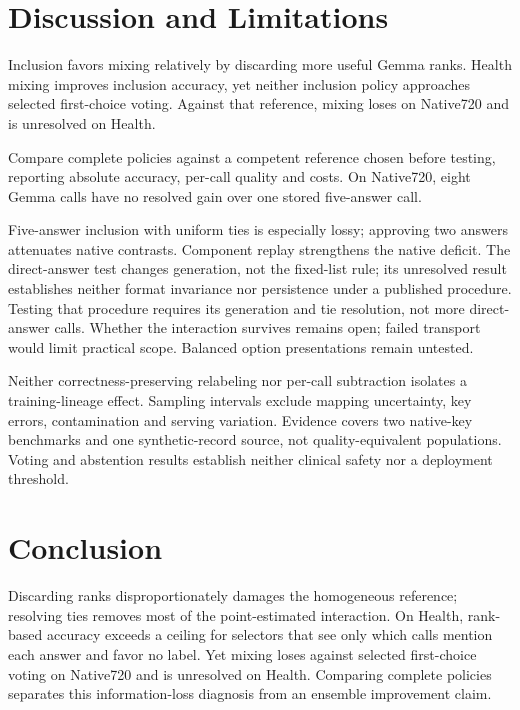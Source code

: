 \documentclass{article}
\begin{document}
\section{Discussion and Limitations}

Inclusion favors mixing relatively by discarding more useful Gemma ranks. Health mixing improves inclusion accuracy, yet neither inclusion policy approaches selected first-choice voting. Against that reference, mixing loses on Native720 and is unresolved on Health.

Compare complete policies against a competent reference chosen before testing, reporting absolute accuracy, per-call quality and costs. On Native720, eight Gemma calls have no resolved gain over one stored five-answer call.

Five-answer inclusion with uniform ties is especially lossy; approving two answers attenuates native contrasts. Component replay strengthens the native deficit. The direct-answer test changes generation, not the fixed-list rule; its unresolved result establishes neither format invariance nor persistence under a published procedure. Testing that procedure requires its generation and tie resolution, not more direct-answer calls. Whether the interaction survives remains open; failed transport would limit practical scope. Balanced option presentations remain untested.

Neither correctness-preserving relabeling nor per-call subtraction isolates a training-lineage effect. Sampling intervals exclude mapping uncertainty, key errors, contamination and serving variation. Evidence covers two native-key benchmarks and one synthetic-record source, not quality-equivalent populations. Voting and abstention results establish neither clinical safety nor a deployment threshold.

\section{Conclusion}

Discarding ranks disproportionately damages the homogeneous reference; resolving ties removes most of the point-estimated interaction. On Health, rank-based accuracy exceeds a ceiling for selectors that see only which calls mention each answer and favor no label. Yet mixing loses against selected first-choice voting on Native720 and is unresolved on Health. Comparing complete policies separates this information-loss diagnosis from an ensemble improvement claim.

\clearpage


\clearpage
\appendix
\end{document}
